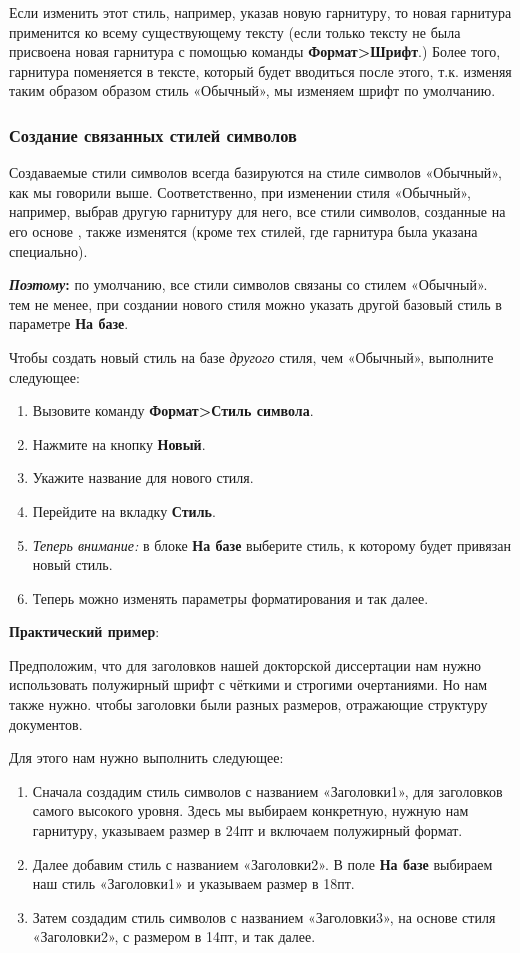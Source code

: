 \documentclass[a4paper,10pt]{article}
\begin{document}
Если изменить этот стиль, например, указав новую гарнитуру, то новая гарнитура применится ко всему существующему тексту (если только тексту не была присвоена новая гарнитура с помощью команды \textbf{Формат>Шрифт}.) Более того, гарнитура поменяется в тексте, который будет вводиться после этого, т.к.  изменяя таким образом образом стиль «Обычный», мы изменяем шрифт по умолчанию.

\subsubsection{Создание связанных стилей символов}
Создаваемые стили символов всегда базируются на стиле символов «Обычный», как мы говорили выше. Соответственно, при изменении стиля «Обычный», например, выбрав другую гарнитуру для него, все стили символов, созданные на его основе , также изменятся (кроме тех стилей, где гарнитура была указана специально).

\begin{mdframed}[backgroundcolor=blue!10]
\textbf{\textit{Поэтому}:} по умолчанию, все стили символов связаны со стилем «Обычный». тем не менее, при создании нового стиля можно указать другой базовый стиль в параметре \textbf{На базе}.
\end{mdframed}

Чтобы создать новый стиль на базе \textit{другого} стиля, чем «Обычный», выполните следующее:
\begin{enumerate}
 \item Вызовите команду \textbf{Формат>Стиль символа}.
 \item Нажмите на кнопку \textbf{Новый}.
 \item Укажите название для нового стиля.
\item Перейдите на вкладку \textbf{Стиль}.
\item \textit{Теперь внимание:} в блоке \textbf{На базе} выберите стиль, к которому будет привязан новый стиль.
\item Теперь можно изменять параметры форматирования и так далее.
\end{enumerate}

\textbf{Практический пример}:

Предположим, что для заголовков нашей докторской диссертации нам нужно использовать полужирный шрифт с чёткими и строгими очертаниями. Но нам также нужно. чтобы заголовки были разных размеров, отражающие структуру документов.

Для этого нам нужно выполнить следующее:
\begin{enumerate}
 \item Сначала создадим стиль символов с названием «Заголовки1», для заголовков самого высокого уровня. Здесь мы выбираем конкретную, нужную нам  гарнитуру, указываем размер в 24пт и включаем полужирный формат.
 \item Далее добавим стиль с названием «Заголовки2». В поле \textbf{На базе} выбираем наш стиль «Заголовки1» и указываем размер в 18пт.
 \item Затем создадим стиль символов с названием «Заголовки3», на основе стиля «Заголовки2», с размером в 14пт, и так далее.
\end{enumerate}
\end{document}
